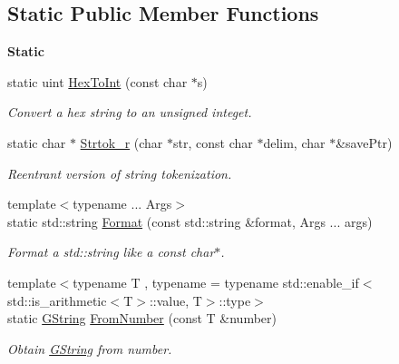 \subsection*{Static Public Member Functions}
\begin{Indent}\textbf{ Static}\par
\begin{DoxyCompactItemize}
\item 
\mbox{\label{classrev_1_1_g_string_a5952d06553d367d984c037bd4eacfd63}} 
static uint \mbox{\hyperlink{classrev_1_1_g_string_a5952d06553d367d984c037bd4eacfd63}{Hex\+To\+Int}} (const char $\ast$s)
\begin{DoxyCompactList}\small\item\em Convert a hex string to an unsigned integet. \end{DoxyCompactList}\item 
static char $\ast$ \mbox{\hyperlink{classrev_1_1_g_string_a5534bc69a6a2219cf84d0a05f420b25e}{Strtok\+\_\+r}} (char $\ast$str, const char $\ast$delim, char $\ast$\&save\+Ptr)
\begin{DoxyCompactList}\small\item\em Reentrant version of string tokenization. \end{DoxyCompactList}\item 
{\footnotesize template$<$typename ... Args$>$ }\\static std\+::string \mbox{\hyperlink{classrev_1_1_g_string_ac049dc925821c651e98433a811100a4d}{Format}} (const std\+::string \&format, Args ... args)
\begin{DoxyCompactList}\small\item\em Format a std\+::string like a const char$\ast$. \end{DoxyCompactList}\item 
\mbox{\label{classrev_1_1_g_string_a5d12dba63feff75a83f814140d24bf24}} 
{\footnotesize template$<$typename T , typename  = typename std\+::enable\+\_\+if$<$std\+::is\+\_\+arithmetic$<$\+T$>$\+::value, T$>$\+::type$>$ }\\static \mbox{\hyperlink{classrev_1_1_g_string}{G\+String}} \mbox{\hyperlink{classrev_1_1_g_string_a5d12dba63feff75a83f814140d24bf24}{From\+Number}} (const T \&number)
\begin{DoxyCompactList}\small\item\em Obtain \mbox{\hyperlink{classrev_1_1_g_string}{G\+String}} from number. \end{DoxyCompactList}\item 

\end{DoxyCompactItemize}
\end{Indent}

